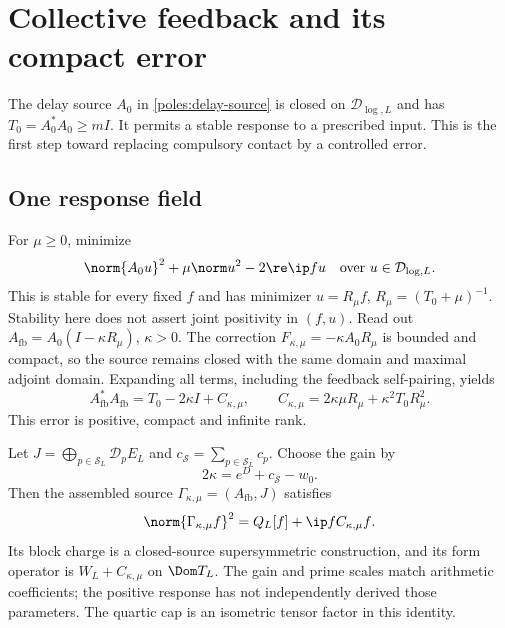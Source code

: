 \section{Collective feedback and its compact error}
\label{sec:feedback}
The delay source $A_0$ in \eqref{poles:delay-source} is closed on
$\mathcal D_{\log,L}$ and has $T_0=A_0^*A_0\ge mI$.
It permits a stable response to a prescribed input. This is the
first step toward replacing compulsory contact by a controlled
error.

\subsection{One response field}
For $\mu\ge0$, minimize
\[
\norm{A_0u}^2+\mu\norm u^2-2\re\ip f u
\quad\text{over }u\in\mathcal D_{\log,L}.
\]
This is stable for every fixed $f$ and has minimizer
$u=R_\mu f$, $R_\mu=(T_0+\mu)^{-1}$. Stability here does not
assert joint positivity in $(f,u)$.
Read out
$A_{\mathrm{fb}}=A_0(I-\kappa R_\mu)$, $\kappa>0$.
The correction $F_{\kappa,\mu}=-\kappa A_0R_\mu$ is bounded and
compact, so the source remains closed with the same domain and
maximal adjoint domain. Expanding all terms, including the
feedback self-pairing, yields
\begin{equation}\label{feedback:identity}
A_{\mathrm{fb}}^*A_{\mathrm{fb}}
 =T_0-2\kappa I+C_{\kappa,\mu},\qquad
C_{\kappa,\mu}=2\kappa\mu R_\mu+\kappa^2T_0R_\mu^2.
\end{equation}
This error is positive, compact and infinite rank.

Let $J=\bigoplus_{p\in\mathcal S_L}\mathcal D_pE_L$ and
$c_{\mathcal S}=\sum_{p\in\mathcal S_L}c_p$. Choose the gain by
\begin{equation}\label{feedback:gain}
2\kappa=e^D+c_{\mathcal S}-w_0.
\end{equation}
Then the assembled source
$\Gamma_{\kappa,\mu}=(A_{\mathrm{fb}},J)$ satisfies
\begin{equation}\label{feedback:complete}
\norm{\Gamma_{\kappa,\mu}f}^2
 =Q_L[f]+\ip f{C_{\kappa,\mu}f}.
\end{equation}
Its block charge is a closed-source supersymmetric construction,
and its form operator is $W_L+C_{\kappa,\mu}$ on $\Dom T_L$.
The gain and prime scales match arithmetic coefficients; the
positive response has not independently derived those parameters.
The quartic cap is an isometric tensor factor in this identity.

